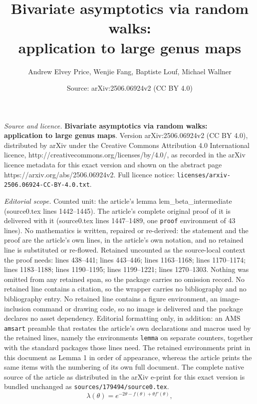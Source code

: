 \documentclass[10pt,a4paper]{amsart}
\title{\textbf{Bivariate asymptotics via random walks: \\application to large genus maps}}
\author{Andrew Elvey Price, Wenjie Fang, Baptiste Louf, Michael Wallner}
\date{Source: arXiv:2506.06924v2 (CC BY 4.0)}
\begin{document}
\maketitle

\noindent\emph{Source and licence.} \textbf{Bivariate asymptotics via random walks: \\application to large genus maps}. Version arXiv:2506.06924v2 (CC BY 4.0), distributed by arXiv under the Creative Commons Attribution 4.0 International licence, http://creativecommons.org/licenses/by/4.0/, as recorded in the arXiv licence metadata for this exact version and shown on the abstract page https://arxiv.org/abs/2506.06924v2. Full licence notice: \texttt{licenses/arxiv-2506.06924-CC-BY-4.0.txt}.\par\smallskip

\noindent\textit{Editorial scope.} Counted unit: the article's lemma lem\_beta\_intermediate (source0.tex lines 1442--1445). The article's complete original proof of it is delivered with it (source0.tex lines 1447--1489, one \texttt{proof} environment of 43 lines). No mathematics is written, repaired or re-derived: the statement and the proof are the article's own lines, in the article's own notation, and no retained line is substituted or re-flowed.  Retained uncounted as the source-local context the proof needs: lines 438--441; lines 443--446; lines 1163--1168; lines 1170--1174; lines 1183--1188; lines 1190--1195; lines 1199--1221; lines 1270--1303.  Nothing was omitted from any retained span, so the package carries no omission record.  No retained line contains a citation, so the wrapper carries no bibliography and no bibliography entry.  No retained line contains a figure environment, an image-inclusion command or drawing code, so no image is delivered and the package declares no asset dependency.  Editorial formatting only, in addition: an AMS \texttt{amsart} preamble that restates the article's own declarations and macros used by the retained lines, namely the environments \texttt{lemma} on separate counters, together with the standard packages those lines need.  The retained environments print in this document as Lemma 1 in order of appearance, whereas the article prints the same items with the numbering of its own full document.  The complete native source of the article as distributed in the arXiv e-print for this exact version is bundled unchanged as \texttt{sources/179494/source0.tex}.
\begin{equation}
    \label{eq:lambdadef}
    \lambda(\theta) = e^{-2\theta-f(\theta)+\theta f'(\theta)},
\end{equation}
\end{document}
